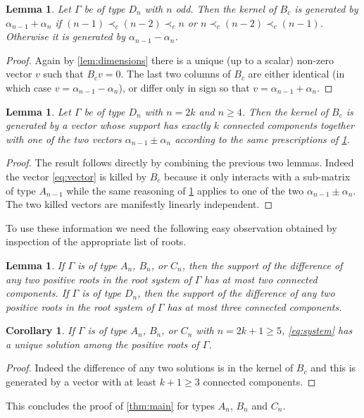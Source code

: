 \documentclass[11pt]{amsart}
\newtheorem{corollary}[theorem]{Corollary}
\newtheorem{lemma}[theorem]{Lemma}
\theoremstyle{definition}
\numberwithin{equation}{section}
\numberwithin{figure}{section}
\begin{document}
  \begin{lemma}
    \label{lem:ker_Dn_even}
    Let $\Gamma$ be of type $D_n$ with $n$ odd.
    Then the kernel of $B_c$ is generated by $\alpha_{n-1}+\alpha_n$ if $(n-1) \prec_c (n-2) \prec_c n$ or $n \prec_c (n-2) \prec_c (n-1)$.
    Otherwise it is generated by $\alpha_{n-1}-\alpha_n$.
  \end{lemma}
  \begin{proof}
    Again by \cref{lem:dimensions} there is a unique (up to a scalar) non-zero vector $v$ such that $B_cv=0$.
    The last two columns of $B_c$ are either identical (in which case $v=\alpha_{n-1}-\alpha_n$), or differ only in sign so that $v=\alpha_{n-1}+\alpha_n$.
  \end{proof}

  \begin{lemma}
    Let $\Gamma$ be of type $D_n$ with $n=2k$ and $n\geq 4$.
    Then the kernel of $B_c$ is generated by a vector whose support has exactly $k$ connected components together with one of the two vectors $\alpha_{n-1}\pm\alpha_n$ according to the same prescriptions of \cref{lem:ker_Dn_even}.
  \end{lemma}
  \begin{proof}
    The result follows directly by combining the previous two lemmas.
    Indeed the vector \cref{eq:vector} is killed by $B_c$ because it only interacts with a sub-matrix of type $A_{n-1}$ while the same reasoning of \cref{lem:ker_Dn_even} applies to one of the two $\alpha_{n-1}\pm\alpha_n$.
    The two killed vectors are manifestly linearly independent.
  \end{proof}

  To use these information we need the following easy observation obtained by inspection of the appropriate list of roots.
  \begin{lemma}
    If $\Gamma$ is of type $A_n$, $B_n$, or $C_n$, then the support of the difference of any two positive roots in the root system of $\Gamma$ has at most two connected components.
    If $\Gamma$ is of type $D_n$, then the support of the difference of any two positive roots in the root system of $\Gamma$ has at most three connected components.
  \end{lemma}

  \begin{corollary}
    If $\Gamma$ is of type $A_n$, $B_n$, or $C_n$ with $n=2k+1\geq 5$, \cref{eq:system} has a unique solution among the positive roots of $\Gamma$.
  \end{corollary}
  \begin{proof}
    Indeed the difference of any two solutions is in the kernel of $B_c$ and this is generated by a vector with at least $k+1\geq3$ connected components.
  \end{proof}
  This concludes the proof of \cref{thm:main} for types $A_n$, $B_n$ and $C_n$.
\end{document}
